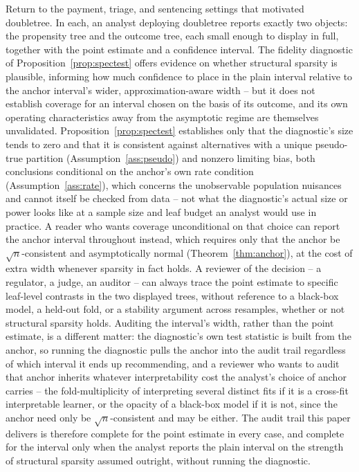 \documentclass[12pt]{article}
\begin{document}
Return to the payment, triage, and sentencing settings that motivated doubletree. In each, an analyst deploying doubletree reports exactly two objects: the propensity tree and the outcome tree, each small enough to display in full, together with the point estimate and a confidence interval. The fidelity diagnostic of Proposition~\ref{prop:spectest} offers evidence on whether structural sparsity is plausible, informing how much confidence to place in the plain interval relative to the anchor interval's wider, approximation-aware width -- but it does not establish coverage for an interval chosen on the basis of its outcome, and its own operating characteristics away from the asymptotic regime are themselves unvalidated. Proposition~\ref{prop:spectest} establishes only that the diagnostic's size tends to zero and that it is consistent against alternatives with a unique pseudo-true partition (Assumption~\ref{ass:pseudo}) and nonzero limiting bias, both conclusions conditional on the anchor's own rate condition (Assumption~\ref{ass:rate}), which concerns the unobservable population nuisances and cannot itself be checked from data -- not what the diagnostic's actual size or power looks like at a sample size and leaf budget an analyst would use in practice. A reader who wants coverage unconditional on that choice can report the anchor interval throughout instead, which requires only that the anchor be $\sqrt n$-consistent and asymptotically normal (Theorem~\ref{thm:anchor}), at the cost of extra width whenever sparsity in fact holds. A reviewer of the decision -- a regulator, a judge, an auditor -- can always trace the point estimate to specific leaf-level contrasts in the two displayed trees, without reference to a black-box model, a held-out fold, or a stability argument across resamples, whether or not structural sparsity holds. Auditing the interval's width, rather than the point estimate, is a different matter: the diagnostic's own test statistic is built from the anchor, so running the diagnostic pulls the anchor into the audit trail regardless of which interval it ends up recommending, and a reviewer who wants to audit that anchor inherits whatever interpretability cost the analyst's choice of anchor carries -- the fold-multiplicity of interpreting several distinct fits if it is a cross-fit interpretable learner, or the opacity of a black-box model if it is not, since the anchor need only be $\sqrt n$-consistent and may be either. The audit trail this paper delivers is therefore complete for the point estimate in every case, and complete for the interval only when the analyst reports the plain interval on the strength of structural sparsity assumed outright, without running the diagnostic.
\end{document}
